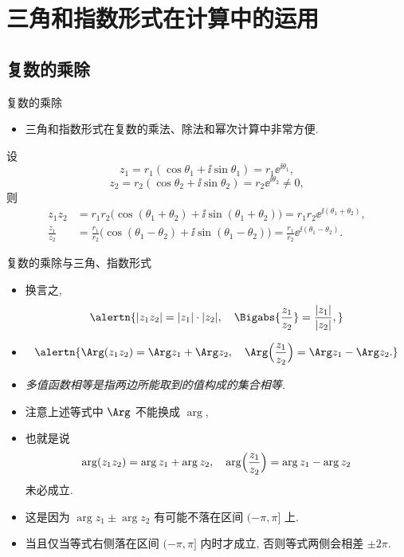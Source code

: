 \section{三角和指数形式在计算中的运用}

\subsection{复数的乘除}
\begin{frame}{复数的乘除}
	\begin{itemize}
		\item 三角和指数形式在复数的乘法、除法和幂次计算中非常方便.
	\end{itemize}
	\onslide<+->
	\begin{theorem}
		设
		\[
			z_1=r_1(\cos\theta_1+\ii\sin\theta_1)=r_1\ee^{\ii\theta_1},
		\]
		\[
			z_2=r_2(\cos\theta_2+\ii\sin\theta_2)=r_2\ee^{\ii\theta_2}\neq 0,
		\]
		则
		\begin{align*}
			z_1z_2&
			=r_1r_2\bigl(\cos(\theta_1+\theta_2)+\ii\sin(\theta_1+\theta_2)\bigr)
			=r_1r_2\ee^{\ii(\theta_1+\theta_2)},\\
			\frac{z_1}{z_2}&
			=\frac{r_1}{r_2}\bigl(\cos(\theta_1-\theta_2)+\ii\sin(\theta_1-\theta_2)\bigr)
			=\frac{r_1}{r_2}\ee^{\ii(\theta_1-\theta_2)}.
		\end{align*}
	\end{theorem}
\end{frame}


\begin{frame}{复数的乘除与三角、指数形式}
	\begin{itemize}
		\item 换言之,
		\[
			\alertn{|z_1z_2|=|z_1|\cdot|z_2|,\quad\Bigabs{\frac{z_1}{z_2}}=\frac{|z_1|}{|z_2|},}
		\]
		\item \[
			\alertn{\Arg(z_1z_2)=\Arg z_1+\Arg z_2,\quad
			\Arg\Bigl(\frac{z_1}{z_2}\Bigr)=\Arg z_1-\Arg z_2.}
		\]
		\item \emph{多值函数相等是指两边所能取到的值构成的集合相等.}
		\item 注意上述等式中 $\Arg$ 不能换成 $\arg$,
		\item 也就是说
		\[
			\arg(z_1z_2)=\arg z_1+\arg z_2,\quad
			\arg\Bigl(\frac{z_1}{z_2}\Bigr)=\arg z_1-\arg z_2
		\]
		\alert{未必成立}.
		\item 这是因为 $\arg z_1\pm\arg z_2$ 有可能不落在区间 $(-\pi,\pi]$ 上.
		\item 当且仅当等式右侧落在区间 $(-\pi,\pi]$ 内时才成立, 否则等式两侧会相差 $\pm2\pi$.
	\end{itemize}
\end{frame}


